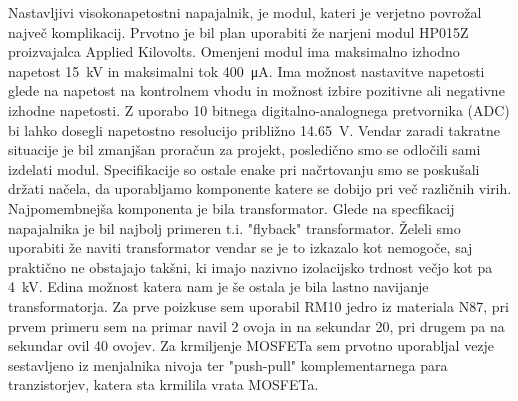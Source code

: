 \documentclass[a4paper,twoside,openright,12pt,slovene]{book}
\begin{document}
 Nastavljivi visokonapetostni napajalnik, je modul, kateri je verjetno povrožal največ komplikacij. Prvotno je bil plan uporabiti že narjeni modul HP015Z proizvajalca Applied Kilovolts. Omenjeni modul ima maksimalno izhodno napetost \SI{15}{\kilo\volt} in maksimalni tok \SI{400}{\micro\ampere}. Ima možnost nastavitve napetosti glede na napetost na kontrolnem vhodu in možnost izbire pozitivne ali negativne izhodne napetosti. Z uporabo 10 bitnega digitalno-analognega pretvornika (ADC) bi lahko dosegli napetostno resolucijo približno \SI{14,65}{\volt}.
Vendar zaradi takratne situacije je bil zmanjšan proračun za projekt, posledično smo se odločili sami izdelati modul. Specifikacije so ostale enake pri načrtovanju smo se poskušali držati načela, da uporabljamo komponente katere se dobijo pri več različnih virih. Najpomembnejša komponenta je bila transformator. Glede na specfikacij napajalnika je bil najbolj primeren t.i. "flyback" transformator. Želeli smo uporabiti že naviti transformator vendar se je to izkazalo kot nemogoče, saj praktično ne obstajajo takšni, ki imajo nazivno izolacijsko trdnost večjo kot pa \SI{4}{\kilo\volt}. 
Edina možnost katera nam je še ostala je bila lastno navijanje transformatorja. Za prve poizkuse sem uporabil RM10 jedro iz materiala N87, pri prvem primeru sem na primar navil 2 ovoja in na sekundar 20, pri drugem pa na sekundar ovil 40 ovojev. %
Za krmiljenje MOSFETa sem prvotno uporabljal vezje sestavljeno iz menjalnika nivoja ter "push-pull" komplementarnega para tranzistorjev, katera sta krmilila vrata MOSFETa.
\end{document}
